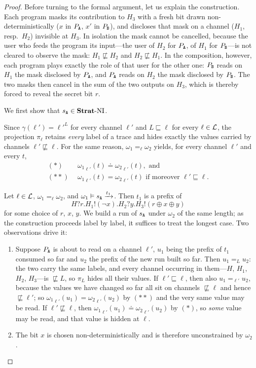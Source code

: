 \documentclass[preprint,5p,twocolumn]{elsarticle}
\begin{document}
\begin{proof}
  Before turning to the formal argument, let us explain the construction. Each program masks its
  contribution to $H_3$ with a fresh bit drawn non-deterministically ($x$ in $P_{\mathtt{A}}$, $x'$ in $P_{\mathtt{B}}$),
  and discloses that mask on a channel ($H_1$, resp.\ $H_2$) invisible at $H_3$. In isolation the
  mask cannot be cancelled, because the user who feeds the program its input---the user of $H_2$
  for $P_{\mathtt{A}}$, of $H_1$ for $P_{\mathtt{B}}$---is not cleared to observe the mask: $H_1 \not\sqsubseteq H_2$ and
  $H_2 \not\sqsubseteq H_1$. In the composition, however, each program plays exactly the role of
  that user for the other one: $P_{\mathtt{B}}$ reads on $H_1$ the mask disclosed by $P_{\mathtt{A}}$, and $P_{\mathtt{A}}$ reads on
  $H_2$ the mask disclosed by $P_{\mathtt{B}}$. The two masks then cancel in the sum of the two outputs on
  $H_3$, which is thereby forced to reveal the secret bit $r$.

  We first show that $s_{\mathtt{A}} \in \mathbf{Strat}\text{-}\mathrm{NI}$.

  Since $\gamma(\ell') = {\ell'}^L$ for every channel $\ell'$ and $L \sqsubseteq \ell$ for every
  $\ell \in \mathcal{L}$, the projection $\pi_\ell$ retains \emph{every} label of a trace and hides
  exactly the values carried by channels $\ell' \not\sqsubseteq \ell$. For the same reason,
  $\omega_1 =_\ell \omega_2$ yields, for every channel $\ell'$ and every $t$,
  \begin{align*}
    (*)~~& {\omega_1}_{\ell'}(t) \doteq {\omega_2}_{\ell'}(t), \text{ and}\\
    (**)~~& {\omega_1}_{\ell'}(t) = {\omega_2}_{\ell'}(t) \text{ if moreover } \ell' \sqsubseteq \ell.
  \end{align*}

  Let $\ell \in \mathcal{L}$, $\omega_1 =_\ell \omega_2$, and $\omega_1 \vDash s_{\mathtt{A}} \xrightarrow{t_1}$.
  Then $t_1$ is a prefix of
  $$H?r.H_1!(\neg x).H_2?y.H_3!(r \oplus x \oplus y)$$
  for some choice of $r$, $x$, $y$. We build a run of $s_{\mathtt{A}}$ under $\omega_2$ of the same length;
  as the construction proceeds label by label, it suffices to treat the longest case. Two
  observations drive it:
  \begin{enumerate}[(1)]
  \item Suppose $P_{\mathtt{A}}$ is about to read on a channel $\ell'$, $u_1$ being the prefix of $t_1$
    consumed so far and $u_2$ the prefix of the new run built so far. Then $u_1 =_L u_2$: the two
    carry the same labels, and every channel occurring in them---$H$, $H_1$, $H_2$, $H_3$---is
    $\not\sqsubseteq L$, so $\pi_L$ hides all their values.
    If $\ell' \sqsubseteq \ell$, then also $u_1 =_{\ell'} u_2$, because
    the values we have changed so far all sit on channels $\not\sqsubseteq \ell$ and hence
    $\not\sqsubseteq \ell'$; so ${\omega_1}_{\ell'}(u_1) = {\omega_2}_{\ell'}(u_2)$ by $(**)$ and
    the very same value may be read. If $\ell' \not\sqsubseteq \ell$, then
    ${\omega_1}_{\ell'}(u_1) \doteq {\omega_2}_{\ell'}(u_2)$ by $(*)$, so \emph{some} value may be
    read, and that value is hidden at $\ell$.
  \item The bit $x$ is chosen non-deterministically and is therefore unconstrained by $\omega_2$.
  \end{enumerate}


\end{proof}
\end{document}
